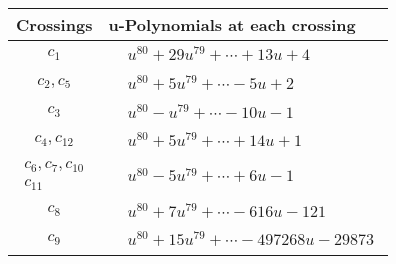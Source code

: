 \documentclass[1p]{elsarticle_modified}
\theoremstyle{definition}
\begin{document}
\begin{tabular}{m{50pt}|m{274pt}}
Crossings & \hspace{64pt}u-Polynomials at each crossing \\
\hline $$\begin{aligned}c_{1}\end{aligned}$$&$\begin{aligned}
&u^{80}+29 u^{79}+\cdots+13 u+4
\end{aligned}$\\
\hline $$\begin{aligned}c_{2},c_{5}\end{aligned}$$&$\begin{aligned}
&u^{80}+5 u^{79}+\cdots-5 u+2
\end{aligned}$\\
\hline $$\begin{aligned}c_{3}\end{aligned}$$&$\begin{aligned}
&u^{80}- u^{79}+\cdots-10 u-1
\end{aligned}$\\
\hline $$\begin{aligned}c_{4},c_{12}\end{aligned}$$&$\begin{aligned}
&u^{80}+5 u^{79}+\cdots+14 u+1
\end{aligned}$\\
\hline $$\begin{aligned}c_{6},c_{7},c_{10}\\c_{11}\end{aligned}$$&$\begin{aligned}
&u^{80}-5 u^{79}+\cdots+6 u-1
\end{aligned}$\\
\hline $$\begin{aligned}c_{8}\end{aligned}$$&$\begin{aligned}
&u^{80}+7 u^{79}+\cdots-616 u-121
\end{aligned}$\\
\hline $$\begin{aligned}c_{9}\end{aligned}$$&$\begin{aligned}
&u^{80}+15 u^{79}+\cdots-497268 u-29873
\end{aligned}$\\
\hline
\end{tabular}\\~\\
\end{document}
